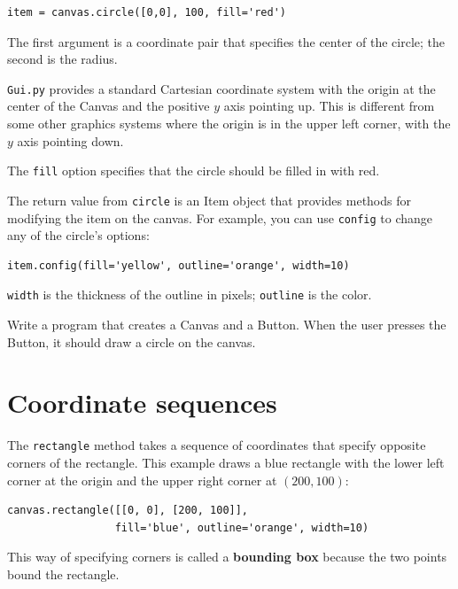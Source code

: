 \documentclass[10pt]{book}
\begin{document}
\begin{verbatim}
item = canvas.circle([0,0], 100, fill='red')
\end{verbatim}
%
The first argument is a coordinate pair that specifies the
center of the circle; the second is the radius.

{\tt Gui.py} provides a standard Cartesian coordinate system with
the origin at the center of the Canvas and the positive $y$ axis
pointing up.  This is different from some other graphics systems
where the origin is in the upper left corner, with the $y$ axis
pointing down.

The {\tt fill} option specifies that the circle should be filled
in with red.

The return value from {\tt circle} is an Item object that
provides methods for modifying the item on the canvas.  For
example, you can use {\tt config} to change any of the circle's
options:

\begin{verbatim}
item.config(fill='yellow', outline='orange', width=10)
\end{verbatim}
%
{\tt width} is the thickness of the outline in pixels;
{\tt outline} is the color.

\begin{exercise}
\label{circle}

Write a program that creates a Canvas and a Button.  When the
user presses the Button, it should draw a circle on the canvas.

\end{exercise}


\section{Coordinate sequences}

The {\tt rectangle} method takes a sequence of coordinates that
specify opposite corners of the rectangle.  This example
draws a blue rectangle with the lower left corner at the origin
and the upper right corner at $(200,100)$:

\begin{verbatim}
canvas.rectangle([[0, 0], [200, 100]], 
                 fill='blue', outline='orange', width=10)
\end{verbatim}
%
This way of specifying corners is called
a {\bf bounding box} because the two points
bound the rectangle.
\end{document}
